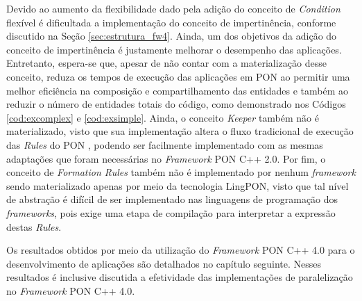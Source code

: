Devido ao aumento da flexibilidade dado pela adição do conceito de
\textit{Condition} flexível é dificultada a implementação do conceito de
impertinência, conforme discutido na Seção \ref{sec:estrutura_fw4}. Ainda, um
dos objetivos da adição do conceito de impertinência é justamente melhorar o
desempenho das aplicações. Entretanto, espera-se que, apesar de não contar com a
materialização desse conceito, reduza os tempos de execução das aplicações em
PON ao permitir uma melhor eficiência na composição e compartilhamento das
entidades e também ao reduzir o número de entidades totais do código, como
demonstrado nos Códigos \ref{cod:excomplex} e \ref{cod:exsimple}. Ainda, o
conceito \textit{Keeper} também não é materializado, visto que sua implementação
altera o fluxo tradicional de execução das \textit{Rules} do PON
\cite{muchalski_2012}, podendo ser facilmente implementado com as mesmas
adaptações que foram necessárias no \textit{Framework} PON C++ 2.0. Por fim, o
conceito de \textit{Formation Rules} também não é implementado por nenhum
\textit{framework} sendo materializado apenas por meio da tecnologia LingPON,
visto que tal nível de abstração é difícil de ser implementado nas linguagens de
programação dos \textit{frameworks}, pois exige uma etapa de compilação para
interpretar a expressão destas \textit{Rules}.


Os resultados obtidos por meio da utilização do \textit{Framework} PON C++ 4.0
para o desenvolvimento de aplicações são detalhados no capítulo seguinte. Nesses
resultados é inclusive discutida a efetividade das implementações de
paralelização no \textit{Framework} PON C++ 4.0.